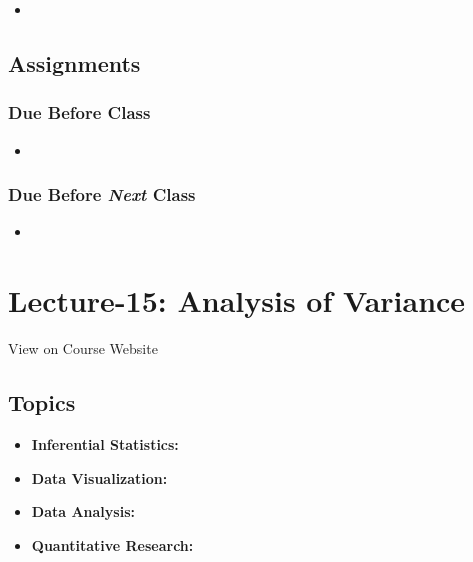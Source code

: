 \documentclass[]{book}
\providecommand{\tightlist}{%
  \setlength{\itemsep}{0pt}\setlength{\parskip}{0pt}}
\theoremstyle{definition}
\theoremstyle{definition}
\theoremstyle{definition}
\theoremstyle{remark}
\begin{document}
\begin{itemize}
\item
\end{itemize}

\subsection*{Assignments}\label{assignments-15}

\subsubsection*{Due Before Class}\label{due-before-class-13}

\begin{itemize}
\item
\end{itemize}

\subsubsection*{\texorpdfstring{Due Before \emph{Next}
Class}{Due Before Next Class}}\label{due-before-next-class-14}

\begin{itemize}
\item
\end{itemize}

\section{Lecture-15: Analysis of
Variance}\label{lecture-15-analysis-of-variance}

View on Course Website

\subsection*{Topics}\label{topics-15}

\begin{itemize}
\tightlist
\item
  \textbf{Inferential Statistics:}
\item
  \textbf{Data Visualization:}
\item
  \textbf{Data Analysis:}
\item
  \textbf{Quantitative Research:}
\end{itemize}
\end{document}
